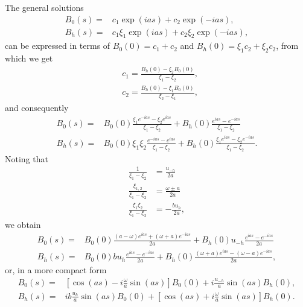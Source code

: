 \documentclass[preprint]{iucr}              %
\begin{document}
The general solutions
\begin{subequations}
\label{eq:BSolutions}
\begin{align}
B_0(s) = &c_1 \exp(i a s) + c_2 \exp(-i a s), \\
B_h(s) = &c_1 \xi_1 \exp(i a s) + c_2 \xi_2 \exp(-i a s),
\end{align}
\end{subequations}
can be expressed in terms of $B_0(0)=c_1+c_2$ and $B_h(0)=\xi_1 c_2+\xi_2 c_2$, from which we get 
\begin{subequations}
\label{eq:cs}
\begin{align}
&c_1=\frac{B_h(0)-\xi_2 B_0(0)}{\xi_1-\xi_2}, \\
&c_2=\frac{B_h(0)-\xi_1 B_0(0)}{\xi_2-\xi_1},
\end{align}
\end{subequations}
and consequently
\begin{subequations}
\label{eq:preBSolutions}
\begin{align}
B_0(s) = &B_0(0) \frac{\xi_1 e^{-ias} - \xi_2 e^{ias}}{\xi_1-\xi_2} + 
    B_h(0) \frac{e^{ias} - e^{-ias}}{\xi_1-\xi_2} \\
B_h(s) = &B_0(0) \xi_1\xi_2 \frac{e^{-ias} - e^{ias}}{\xi_1-\xi_2} + 
    B_h(0) \frac{\xi_1 e^{ias} - \xi_2 e^{-ias}}{\xi_1-\xi_2}.
\end{align}
\end{subequations}
Noting that 
\begin{subequations}
\label{eq:xiidentities}
\begin{align}
\frac{1}{\xi_1-\xi_2}&=\frac{u_{-h}}{2a} \\
\frac{\xi_{1,2}}{\xi_1-\xi_2}&=\frac{\omega \pm a}{2a}\\
\frac{\xi_1 \xi_2}{\xi_1-\xi_2}&=-\frac{b u_h}{2a},
\end{align}
\end{subequations}
we obtain
\begin{subequations}
\label{eq:BSolutions}
\begin{align}
B_0(s) = &B_0(0) \frac{(a-\omega) e^{ias} + (\omega+a) e^{-ias}}{2a} + 
    B_h(0) u_{-h} \frac{e^{ias} - e^{-ias}}{2a} \\
B_h(s) = &B_0(0) b u_h \frac{e^{ias} - e^{-ias}}{2a} + 
    B_h(0) \frac{(\omega+a) e^{ias} - (\omega-a) e^{-ias}}{2a},
\end{align}
\end{subequations}
or, in a more compact form
\begin{subequations}
\label{eq:BSolutionsCompact}
\begin{align}
B_0(s) = & [\cos(as) - i\frac{\omega}{a}\sin(as)] B_0(0) +     i \frac{u_{-h}}{a}\sin(as) B_h(0), \\
B_h(s) = & i b \frac{u_h}{a} \sin(as) B_0(0) + 
    [\cos(as) + i \frac{\omega}{a} \sin(as)] B_h(0).
\end{align}
\end{subequations}
\end{document}
